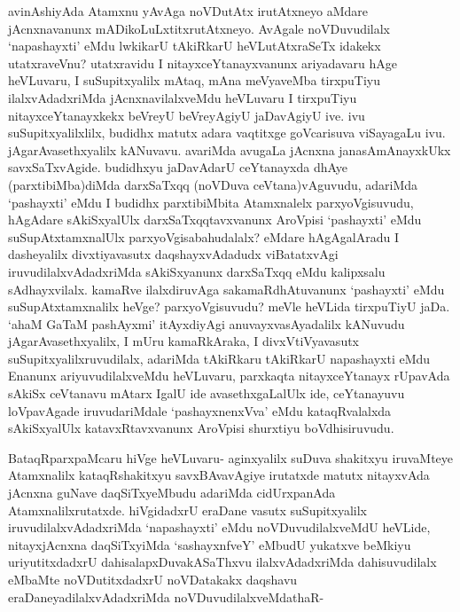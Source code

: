 \begin{artha}
avinAshiyAda Atamxnu yAvAga noVDutAtx irutAtxneyo aMdare jAcnxnavanunx mADikoLuLxtitxrutAtxneyo. AvAgale noVDuvudilalx `napashayxti' eMdu lwkikarU tAkiRkarU heVLutAtxraSeTx idakekx utatxraveVnu? utatxravidu I nitayxceYtanayxvanunx ariyadavaru hAge heVLuvaru, I suSupitxyalilx mAtaq, mAna meVyaveMba tirxpuTiyu ilalxvAdadxriMda jAcnxnavilalxveMdu heVLuvaru I tirxpuTiyu nitayxceYtanayxkekx beVreyU beVreyAgiyU jaDavAgiyU ive. ivu suSupitxyalilxlilx, budidhx matutx adara vaqtitxge goVcarisuva viSayagaLu ivu. jAgarAvasethxyalilx kANuvavu. avariMda avugaLa jAcnxna janasAmAnayxkUkx savxSaTxvAgide. budidhxyu jaDavAdarU ceYtanayxda dhAye (parxtibiMba)diMda darxSaTxqq (noVDuva ceVtana)vAguvudu, adariMda `pashayxti' eMdu I budidhx parxtibiMbita Atamxnalelx parxyoVgisuvudu, hAgAdare sAkiSxyalUlx darxSaTxqqtavxvanunx AroVpisi `pashayxti' eMdu suSupAtxtamxnalUlx parxyoVgisabahudalalx? eMdare hAgAgalAradu I dasheyalilx divxtiyavasutx daqshayxvAdadudx viBatatxvAgi iruvudilalxvAdadxriMda sAkiSxyanunx darxSaTxqq eMdu kalipxsalu sAdhayxvilalx. kamaRve ilalxdiruvAga sakamaRdhAtuvanunx `pashayxti' eMdu suSupAtxtamxnalilx heVge? parxyoVgisuvudu? meVle heVLida tirxpuTiyU jaDa. `ahaM GaTaM pashAyxmi' itAyxdiyAgi anuvayxvasAyadalilx kANuvudu jAgarAvasethxyalilx, I mUru kamaRkAraka, I divxVtiVyavasutx suSupitxyalilxruvudilalx, adariMda tAkiRkaru tAkiRkarU napashayxti eMdu Enanunx ariyuvudilalxveMdu heVLuvaru, parxkaqta nitayxceYtanayx rUpavAda sAkiSx ceVtanavu mAtarx IgalU ide avasethxgaLalUlx ide, ceYtanayuvu loVpavAgade iruvudariMdale `pashayxnenxVva' eMdu kataqRvalalxda sAkiSxyalUlx katavxRtavxvanunx AroVpisi shurxtiyu boVdhisiruvudu. 
\end{artha}%



\begin{artha}
BataqRparxpaMcaru hiVge heVLuvaru- aginxyalilx suDuva shakitxyu iruvaMteye Atamxnalilx kataqRshakitxyu savxBAvavAgiye irutatxde matutx nitayxvAda jAcnxna guNave daqSiTxyeMbudu adariMda cidUrxpanAda Atamxnalilxrutatxde. hiVgidadxrU eraDane vasutx suSupitxyalilx iruvudilalxvAdadxriMda `napashayxti' eMdu noVDuvudilalxveMdU heVLide, nitayxjAcnxna daqSiTxyiMda `sashayxnfveY' eMbudU yukatxve beMkiyu uriyutitxdadxrU dahisalapxDuvakASaThxvu ilalxvAdadxriMda dahisuvudilalx eMbaMte noVDutitxdadxrU noVDatakakx daqshavu eraDaneyadilalxvAdadxriMda noVDuvudilalxveMdathaR-
\end{artha}

